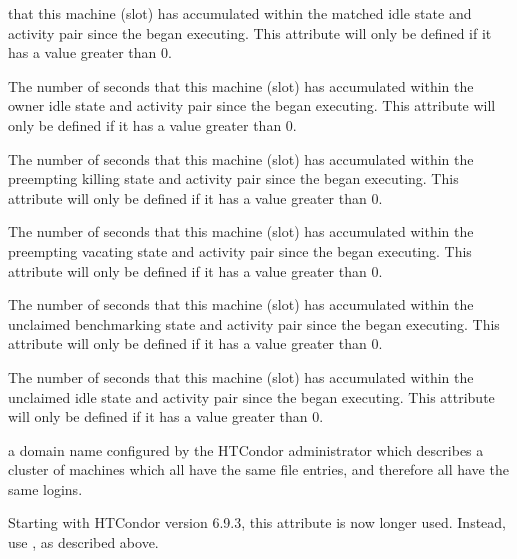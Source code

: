 \begin{description}
that this machine (slot) has accumulated within the
matched idle state and activity pair since the 
began executing.
This attribute will only be defined if it has a value greater than 0.
%
\item[\AdAttr{TotalTimeOwnerIdle}:] The number of seconds
that this machine (slot) has accumulated within the
owner idle state and activity pair since the 
began executing.
This attribute will only be defined if it has a value greater than 0.
%
\item[\AdAttr{TotalTimePreemptingKilling}:] The number of seconds
that this machine (slot) has accumulated within the
preempting killing state and activity pair since the 
began executing.
This attribute will only be defined if it has a value greater than 0.
%
\item[\AdAttr{TotalTimePreemptingVacating}:] The number of seconds
that this machine (slot) has accumulated within the
preempting vacating state and activity pair since the 
began executing.
This attribute will only be defined if it has a value greater than 0.
%
\item[\AdAttr{TotalTimeUnclaimedBenchmarking}:] The number of seconds
that this machine (slot) has accumulated within the
unclaimed benchmarking state and activity pair since the 
began executing.
This attribute will only be defined if it has a value greater than 0.
%
\item[\AdAttr{TotalTimeUnclaimedIdle}:] The number of seconds
that this machine (slot) has accumulated within the
unclaimed idle state and activity pair since the 
began executing.
This attribute will only be defined if it has a value greater than 0.
%
\item[\AdAttr{UidDomain}:] a domain name configured by the HTCondor 
administrator which describes a cluster of machines which all have 
the same  file entries, and therefore all have the same logins.
%
\item[\AdAttr{VirtualMachineID}:] 
Starting with HTCondor version 6.9.3, this attribute is now longer used.
Instead, use , as described above.

\end{description}
